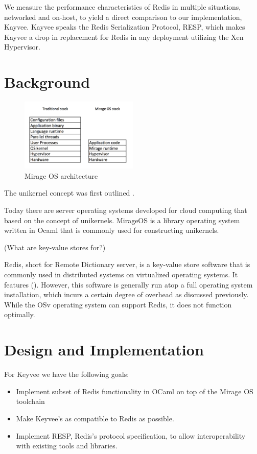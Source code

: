 \documentclass[english,10pt,twocolumn]{article}
\begin{document}
We measure the performance characteristics of Redis in multiple situations, networked and on-host, to yield a direct comparison to our implementation, Kayvee.
Kayvee speaks the Redis Serialization Protocol\cite{redis-protocol}, RESP, which makes Kayvee a drop in replacement for Redis in any deployment utilizing the Xen Hypervisor.


\section{Background}

\begin{figure}[ht]
  \centering
  \caption{Mirage OS architecture}
  \includegraphics[width=0.5\textwidth]{images/design}
\end{figure}

The unikernel concept was first outlined .

Today there are server operating systems developed for cloud computing that based on the concept of unikernels. MirageOS is a library operating system written in Ocaml that is commonly used for constructing unikernels.

(What are key-value stores for?) 

Redis, short for Remote Dictionary server, is a key-value store software that is commonly used in distributed systems on virtualized operating systems. It features (). However, this software is generally run atop a full operating system installation, which incurs a certain degree of overhead as discussed previously.  While the OSv operating system can support Redis, it does not function optimally.


\section{Design and Implementation}

For Keyvee we have the following goals:
\begin{itemize}
  \item Implement subset of Redis functionality in OCaml on top of the Mirage OS toolchain
  \item Make Keyvee's as compatible to Redis as possible.
  \item Implement RESP, Redis's protocol specification, to allow interoperability with existing tools and libraries.
\end{itemize}
\end{document}
